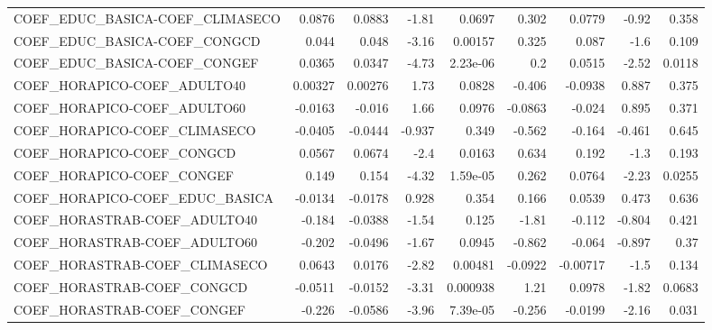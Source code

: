 \begin{tabular}{lrrrrrrrr}
COEF\_EDUC\_BASICA-COEF\_CLIMASECO       &      0.0876 &       0.0883 &   -1.81 &   0.0697 &      0.302 &      0.0779 &        -0.92 &         0.358 \\
COEF\_EDUC\_BASICA-COEF\_CONGCD          &       0.044 &        0.048 &   -3.16 &  0.00157 &      0.325 &       0.087 &         -1.6 &         0.109 \\
COEF\_EDUC\_BASICA-COEF\_CONGEF          &      0.0365 &       0.0347 &   -4.73 & 2.23e-06 &        0.2 &      0.0515 &        -2.52 &        0.0118 \\
COEF\_HORAPICO-COEF\_ADULTO40           &     0.00327 &      0.00276 &    1.73 &   0.0828 &     -0.406 &     -0.0938 &        0.887 &         0.375 \\
COEF\_HORAPICO-COEF\_ADULTO60           &     -0.0163 &       -0.016 &    1.66 &   0.0976 &    -0.0863 &      -0.024 &        0.895 &         0.371 \\
COEF\_HORAPICO-COEF\_CLIMASECO          &     -0.0405 &      -0.0444 &  -0.937 &    0.349 &     -0.562 &      -0.164 &       -0.461 &         0.645 \\
COEF\_HORAPICO-COEF\_CONGCD             &      0.0567 &       0.0674 &    -2.4 &   0.0163 &      0.634 &       0.192 &         -1.3 &         0.193 \\
COEF\_HORAPICO-COEF\_CONGEF             &       0.149 &        0.154 &   -4.32 & 1.59e-05 &      0.262 &      0.0764 &        -2.23 &        0.0255 \\
COEF\_HORAPICO-COEF\_EDUC\_BASICA        &     -0.0134 &      -0.0178 &   0.928 &    0.354 &      0.166 &      0.0539 &        0.473 &         0.636 \\
COEF\_HORASTRAB-COEF\_ADULTO40          &      -0.184 &      -0.0388 &   -1.54 &    0.125 &      -1.81 &      -0.112 &       -0.804 &         0.421 \\
COEF\_HORASTRAB-COEF\_ADULTO60          &      -0.202 &      -0.0496 &   -1.67 &   0.0945 &     -0.862 &      -0.064 &       -0.897 &          0.37 \\
COEF\_HORASTRAB-COEF\_CLIMASECO         &      0.0643 &       0.0176 &   -2.82 &  0.00481 &    -0.0922 &    -0.00717 &         -1.5 &         0.134 \\
COEF\_HORASTRAB-COEF\_CONGCD            &     -0.0511 &      -0.0152 &   -3.31 & 0.000938 &       1.21 &      0.0978 &        -1.82 &        0.0683 \\
COEF\_HORASTRAB-COEF\_CONGEF            &      -0.226 &      -0.0586 &   -3.96 & 7.39e-05 &     -0.256 &     -0.0199 &        -2.16 &         0.031 \\

\end{tabular}
